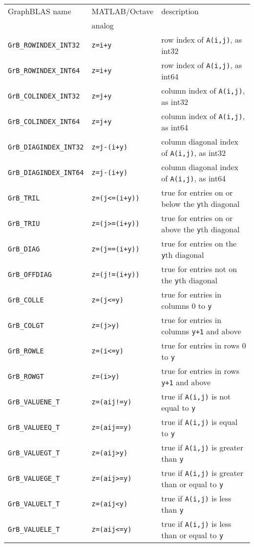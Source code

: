 \documentclass[12pt]{article}
\begin{document}
\vspace{0.2in}
\noindent
{\footnotesize
\begin{tabular}{lll}
\hline
GraphBLAS name          & MATLAB/Octave     & description \\
                        & analog            & \\
\hline
\verb'GrB_ROWINDEX_INT32'  & \verb'z=i+y'       & row index of \verb'A(i,j)', as int32 \\
\verb'GrB_ROWINDEX_INT64'  & \verb'z=i+y'       & row index of \verb'A(i,j)', as int64 \\
\verb'GrB_COLINDEX_INT32'  & \verb'z=j+y'       & column index of \verb'A(i,j)', as int32 \\
\verb'GrB_COLINDEX_INT64'  & \verb'z=j+y'       & column index of \verb'A(i,j)', as int64 \\
\verb'GrB_DIAGINDEX_INT32' & \verb'z=j-(i+y)'   & column diagonal index of \verb'A(i,j)', as int32 \\
\verb'GrB_DIAGINDEX_INT64' & \verb'z=j-(i+y)'   & column diagonal index of \verb'A(i,j)', as int64 \\
\hline
\verb'GrB_TRIL'    & \verb'z=(j<=(i+y))'  & true for entries on or below the \verb'y'th diagonal \\
\verb'GrB_TRIU'    & \verb'z=(j>=(i+y))'  & true for entries on or above the \verb'y'th diagonal \\
\verb'GrB_DIAG'    & \verb'z=(j==(i+y))'  & true for entries on the \verb'y'th diagonal \\
\verb'GrB_OFFDIAG' & \verb'z=(j!=(i+y))'  & true for entries not on the \verb'y'th diagonal \\
\verb'GrB_COLLE'   & \verb'z=(j<=y)'      & true for entries in columns 0 to \verb'y' \\
\verb'GrB_COLGT'   & \verb'z=(j>y)'       & true for entries in columns \verb'y+1' and above \\
\verb'GrB_ROWLE'   & \verb'z=(i<=y)'      & true for entries in rows 0 to \verb'y' \\
\verb'GrB_ROWGT'   & \verb'z=(i>y)'       & true for entries in rows \verb'y+1' and above \\
\hline
\verb'GrB_VALUENE_T'     & \verb'z=(aij!=y)'    & true if \verb'A(i,j)' is not equal to \verb'y'\\
\verb'GrB_VALUEEQ_T'     & \verb'z=(aij==y)'    & true if \verb'A(i,j)' is equal to \verb'y'\\
\verb'GrB_VALUEGT_T'     & \verb'z=(aij>y)'     & true if \verb'A(i,j)' is greater than \verb'y' \\
\verb'GrB_VALUEGE_T'     & \verb'z=(aij>=y)'    & true if \verb'A(i,j)' is greater than or equal to \verb'y' \\
\verb'GrB_VALUELT_T'     & \verb'z=(aij<y)'     & true if \verb'A(i,j)' is less than \verb'y' \\
\verb'GrB_VALUELE_T'     & \verb'z=(aij<=y)'    & true if \verb'A(i,j)' is less than or equal to \verb'y' \\
%
\hline
\end{tabular}
}
\vspace{0.2in}
\end{document}
